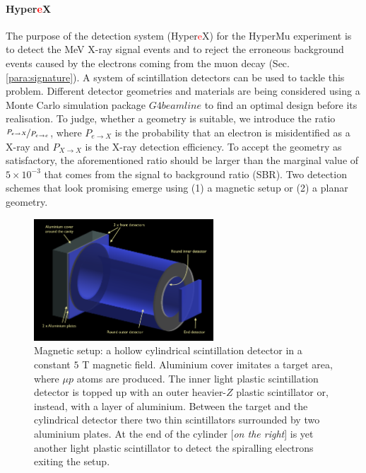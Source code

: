 \documentclass[12pt]{article}
\begin{document}
\paragraph{Hyper\textcolor{red}{e}X}
The purpose of the detection system (Hyper\textcolor{red}{e}X) for the HyperMu experiment is to detect the MeV X-ray signal events and to reject the erroneous background events caused by the electrons coming from the muon decay (Sec. \ref{para:signature}). A system of scintillation detectors can be used to tackle this problem. Different detector geometries and materials are being considered using a Monte Carlo simulation package $G4beamline$ \cite{g4beam} to find an optimal design before its realisation. To judge, whether a geometry is suitable, we introduce the ratio $\nicefrac{P_{{e{\rightarrow}{X}}}}{P_{{e}\rightarrow{e}}}$, where $P_{e{\rightarrow}X}$ is the probability that an electron is misidentified as a X-ray and $P_{X{\rightarrow}X}$ is the X-ray detection efficiency. To accept the geometry as satisfactory, the aforementioned ratio should be larger than the marginal value of $5 \times 10^{-3}$ that comes from the signal to background ratio (SBR). Two detection schemes that look promising emerge using (1) a magnetic setup or (2) a planar geometry. 
\begin{figure}[!htbp]
\centering
\includegraphics[width=0.6\textwidth]{img/magnetic.png}
\caption{Magnetic setup: a hollow cylindrical scintillation detector in a constant $5$ T magnetic field. Aluminium cover imitates a target area, where $\mu{p}$ atoms are produced. The inner light plastic scintillation detector is topped up with an outer heavier-$Z$ plastic scintillator or, instead, with a layer of aluminium. Between the target and the cylindrical detector there two thin scintillators surrounded by two aluminium plates. At the end of the cylinder [\textit{on the right}] is yet another light plastic scintillator to detect the spiralling electrons exiting the setup.}
\label{fig:magnetic}
\end{figure}
\end{document}
